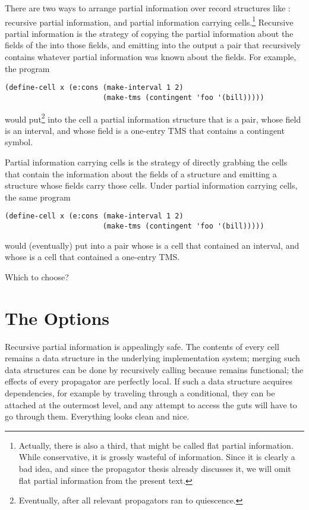 \documentclass[12pt,letterpaper]{article}
\begin{document}
There are two ways to arrange partial information over record
structures like : recursive partial information, and
partial information carrying cells.\footnote{Actually, there is also a
  third, that might be called flat partial information.  While
  conservative, it is grossly wasteful of information.  Since it is
  clearly a bad idea, and since the propagator thesis already
  discusses it, we will omit flat partial information from the present
  text.}  Recursive partial information is the strategy of copying the
partial information about the fields of the  into those
fields, and emitting into the output a pair that recursively contains
whatever partial information was known about the fields.  For example,
the program
\begin{verbatim}
(define-cell x (e:cons (make-interval 1 2)
                       (make-tms (contingent 'foo '(bill)))))
\end{verbatim}
would put\footnote{Eventually, after all relevant propagators ran to quiescence.}
into the cell  a partial information
structure that is a pair, whose  field is an interval, and
whose  field is a one-entry TMS that contains a contingent
symbol.

Partial information carrying cells is the strategy of directly
grabbing the cells that contain the information about the fields of a
structure and emitting a structure whose fields carry those cells.
Under partial information carrying cells, the same program
\begin{verbatim}
(define-cell x (e:cons (make-interval 1 2)
                       (make-tms (contingent 'foo '(bill)))))
\end{verbatim}
would (eventually) put into  a pair whose  is a
cell that contained an interval, and whose  is a cell that
contained a one-entry TMS.

Which to choose?

\section{The Options}

Recursive partial information is appealingly safe.  The contents of
every cell remains a data structure in the underlying implementation
system; merging such data structures can be done by recursively
calling  because  remains functional; the
effects of every propagator are perfectly local.  If such a data
structure acquires dependencies, for example by traveling through a
conditional, they can be attached at the outermost level, and any
attempt to access the guts will have to go through them.  Everything
looks clean and nice.
\end{document}
